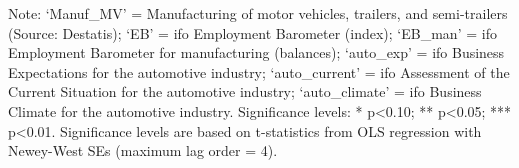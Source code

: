 \begin{table}[h!]
\begin{threeparttable}
    \begin{tablenotes}[flushleft]
      \small \item Note: ‘Manuf\_MV’ = Manufacturing of motor vehicles, trailers, and semi-trailers (Source: Destatis); ‘EB’ = ifo Employment Barometer (index); ‘EB\_man’ = ifo Employment Barometer for manufacturing (balances); ‘auto\_exp’ = ifo Business Expectations for the automotive industry; ‘auto\_current’ = ifo Assessment of the Current Situation for the automotive industry; ‘auto\_climate’ = ifo Business Climate for the automotive industry. Significance levels: * p<0.10; ** p<0.05; *** p<0.01. Significance levels are based on t-statistics from OLS regression with Newey-West SEs (maximum lag order = 4).
    \end{tablenotes}
  \end{threeparttable}
\end{table}

